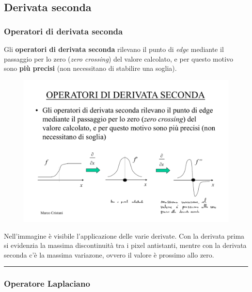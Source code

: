 \documentclass[a4paper]{article}
\newcommand{\longline}{\noindent\rule{\textwidth}{0.4pt}}
\begin{document}
	\subsection{Derivata seconda}
	
	\subsubsection{Operatori di derivata seconda}
	
	Gli \textcolor{Red3}{\textbf{operatori di derivata seconda}} rilevano il punto di \emph{edge} mediante il passaggio per lo zero (\emph{zero crossing}) del valore calcolato, e per questo motivo sono \textbf{più precisi} (non necessitano di stabilire una soglia).
	\begin{figure}[!htp]
		\centering
		\includegraphics[width=\textwidth]{img/derivata_seconda.pdf}
	\end{figure}
	
	\noindent
	Nell'immagine è visibile l'applicazione delle varie derivate. Con la derivata prima si evidenzia la massima discontinuità tra i pixel antistanti, mentre con la derivata seconda c'è la massima variazone, ovvero il valore è prossimo allo zero.
	
	\longline
	
	\subsubsection{Operatore Laplaciano}
	
\end{document}
